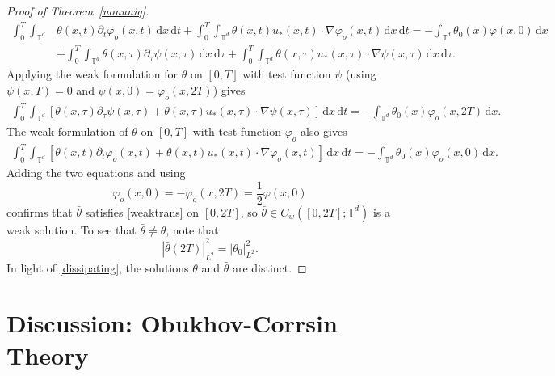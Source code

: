 \documentclass[12pt]{report}   %
\numberwithin{equation}{section}
\theoremstyle{plain}
\theoremstyle{definition}
\theoremstyle{remark}
\newcommand{\rmd}{\, \mathrm{d}}
\begin{document}
\begin{proof}[Proof of Theorem~\ref{nonuniq}]
   \begin{align}\nonumber
   \int_0^{T} \int_{\mathbb{T}^d}& \theta (x,t) \partial_t \varphi_o(x,t)  \rmd x \rmd t+ \int_0^{T} \int_{\mathbb{T}^d} \theta (x,t)u_*(x,t)  \cdot \nabla \varphi_o(x,t)  \rmd x \rmd t =  -\int_{\mathbb{T}^d} \theta_0 (x)  \varphi(x,0)  \rmd x\\ \nonumber
      &+  \int_0^{T} \int_{\mathbb{T}^d} \theta (x,\tau) \partial_\tau \psi(x,\tau )  \rmd x \rmd \tau+    \int_0^{T} \int_{\mathbb{T}^d} \theta (x,\tau)u_*(x,\tau) \cdot \nabla \psi(x,\tau )  \rmd x \rmd \tau .
   \end{align}
Applying the weak formulation for $\theta$ on $[0,T]$ with test function $\psi$ (using $\psi(x,T)=0$ and $\psi(x,0)=\varphi_o(x,2T)$) gives
      \begin{align}\nonumber
  \int_0^{T} \int_{\mathbb{T}^d}\left[ \theta (x,\tau) \partial_\tau \psi(x,\tau ) + \theta (x,\tau)u_*(x,\tau) \cdot \nabla \psi(x,\tau ) \right] \rmd x \rmd t  =-\int_{\mathbb{T}^d} \theta_0 (x)  \varphi_o(x,2T)  \rmd x.
   \end{align}
The weak formulation of $\theta$ on $[0,T]$ with test function $\varphi_o$ also gives
         \begin{align}\nonumber
 \int_0^{T} \int_{\mathbb{T}^d}\left[ \theta (x,t) \partial_t \varphi_o(x,t) + \theta (x,t)u_*(x,t)  \cdot \nabla \varphi_o(x,t) \right] \rmd x \rmd t =  -\int_{\mathbb{T}^d} \theta_0 (x)  \varphi_o(x,0)  \rmd x.
   \end{align}
   Adding the two equations and using
   \begin{equation}
    \varphi_o(x,0)=  -\varphi_o(x,2T) = \frac{1}{2}\varphi(x,0)
   \end{equation}
confirms that $\bar{\theta}$ satisfies \eqref{weaktrans} on $[0,2T]$, so $\bar{\theta}\in C_w([0,2T]; \mathbb{T}^d)$ is a weak solution. To see that $\bar\theta \ne \theta$, note that
     \begin{equation}
 | \bar{\theta}(2T)|_{L^2}^2 =  | \theta_0|_{L^2}^2.
     \end{equation}
In light of \eqref{dissipating}, the solutions $\theta$ and $\bar{\theta}$ are distinct. 
  \end{proof}



\section{Discussion:  Obukhov-Corrsin Theory}\label{disc}
\end{document}
